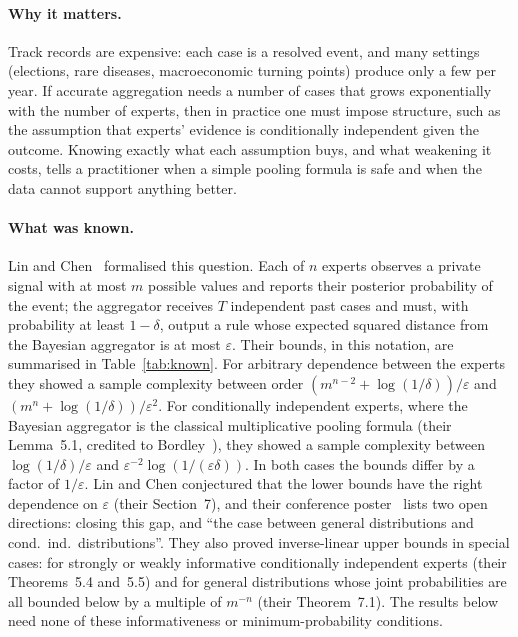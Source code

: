 \documentclass[11pt,a4paper]{article}
\theoremstyle{remark}
\newcommand{\eps}{\varepsilon}
\begin{document}
\paragraph{Why it matters.}
Track records are expensive: each case is a resolved event, and many settings (elections, rare diseases, macroeconomic turning points) produce only a few per year. If accurate aggregation needs a number of cases that grows exponentially with the number of experts, then in practice one must impose structure, such as the assumption that experts' evidence is conditionally independent given the outcome. Knowing exactly what each assumption buys, and what weakening it costs, tells a practitioner when a simple pooling formula is safe and when the data cannot support anything better.

\paragraph{What was known.}
Lin and Chen~\cite{lc} formalised this question. Each of $n$ experts observes a private signal with at most $m$ possible values and reports their posterior probability of the event; the aggregator receives $T$ independent past cases and must, with probability at least $1-\delta$, output a rule whose expected squared distance from the Bayesian aggregator is at most $\eps$. Their bounds, in this notation, are summarised in Table~\ref{tab:known}. For arbitrary dependence between the experts they showed a sample complexity between order $(m^{n-2}+\log(1/\delta))/\eps$ and $(m^n+\log(1/\delta))/\eps^2$. For conditionally independent experts, where the Bayesian aggregator is the classical multiplicative pooling formula (their Lemma~5.1, credited to Bordley~\cite{bordley}), they showed a sample complexity between $\log(1/\delta)/\eps$ and $\eps^{-2}\log(1/(\eps\delta))$. In both cases the bounds differ by a factor of $1/\eps$. Lin and Chen conjectured that the lower bounds have the right dependence on $\eps$ (their Section~7), and their conference poster~\cite{poster} lists two open directions: closing this gap, and ``the case between general distributions and cond.\ ind.\ distributions''. They also proved inverse-linear upper bounds in special cases: for strongly or weakly informative conditionally independent experts (their Theorems~5.4 and~5.5) and for general distributions whose joint probabilities are all bounded below by a multiple of $m^{-n}$ (their Theorem~7.1). The results below need none of these informativeness or minimum-probability conditions.
\end{document}

